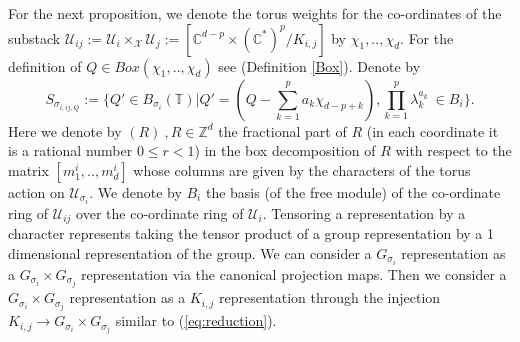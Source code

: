 \documentclass[10pt]{amsart}
\newcommand{\sX}{{\mathcal X}}
\numberwithin{equation}{subsection}
\begin{document}
For the next proposition, we denote the torus weights for the co-ordinates of the substack $\mathscr{U}_{ij}:=\mathscr{U}_i\times_{\sX}\mathscr{U}_j:=[\mathbb{C}^{d-p}\times (\mathbb{C}^{*})^p/K_{i,j}]$ by $\chi_1,..,\chi_d.$ For the definition of $Q\in Box(\chi_1,..,\chi_d)$ see (Definition \ref{Box}). Denote by $$ S_{\sigma_{i,ij,Q}}:=\{Q'\in B_{\sigma_{i}}(\mathbb{T})\bigg|Q'=(Q-\sum_{k=1}^{p}a_k\chi_{d-p+k}),\prod_{k=1}^{p}\lambda_k^{a_k} \ \in B_{i}\}.$$ Here we denote by $(R)\ , R\in \mathbb{Z}^d$ the fractional part of $R$ (in each coordinate it is a rational number $0\leq r<1$) in the box decomposition of $R$ with respect to the matrix $[m^i_1,..,m^i_d]$ whose columns are given by the characters of the torus action on $\mathscr{U}_{\sigma_i}.$ We denote by $B_i$ the basis (of the free module) of the co-ordinate ring of $\mathscr{U}_{ij}$ over the co-ordinate ring of $\mathscr{U}_i.$ Tensoring a representation by a character represents taking the tensor product of a group representation by a 1 dimensional representation of the group. We can consider a $G_{\sigma_i}$ representation as a $G_{\sigma_i}\times G_{\sigma_j}$ representation via the canonical projection maps. Then we consider a $G_{\sigma_i}\times G_{\sigma_j}$ representation as a $K_{i,j}$ representation through the injection $K_{i,j}\to G_{\sigma_i}\times G_{\sigma_j}$ similar to (\ref{eq:reduction}).
\end{document}
